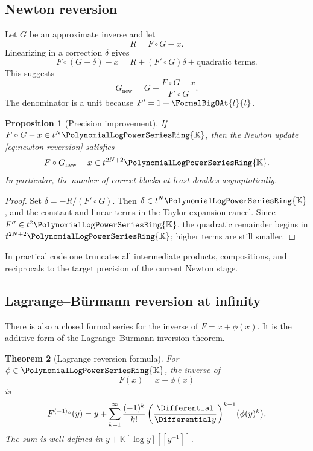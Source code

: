\documentclass[11pt]{article}
\theoremstyle{pltheorem}
\newtheorem{theorem}{Theorem}[section]
\newtheorem{proposition}[theorem]{Proposition}
\newcommand{\K}{\mathbb K}
\newcommand{\PL}{\PolynomialLogPowerSeriesRing{\K}}
\newcommand{\rev}{\langle-1\rangle_{\circ}}
\newcommand{\compose}{\mathbin{\circ}}
\begin{document}
\subsection{Newton reversion}

Let \(G\) be an approximate inverse and let
\begin{equation}\label{eq:reversion-residual}
 R=F\compose G-x.
\end{equation}
Linearizing in a correction \(\delta\) gives
\[
 F\compose(G+\delta)-x
 =R+(F'\compose G)\delta+\text{quadratic terms}.
\]
This suggests
\begin{equation}\label{eq:newton-reversion}
 G_{\mathrm{new}}
 =G-\frac{F\compose G-x}{F'\compose G}.
\end{equation}
The denominator is a unit because \(F'=1+\FormalBigOAt{t}{t}\).

\begin{proposition}[Precision improvement]\label{prop:newton-reversion-precision}
If \(F\compose G-x\in t^N\PL\), then the Newton update
\cref{eq:newton-reversion} satisfies
\begin{equation}\label{eq:newton-reversion-precision}
 F\compose G_{\mathrm{new}}-x\in t^{2N+2}\PL.
\end{equation}
In particular, the number of correct blocks at least doubles asymptotically.
\end{proposition}

\begin{proof}
Set \(\delta=-R/(F'\compose G)\).  Then \(\delta\in t^N\PL\), and the constant and linear terms in the Taylor expansion cancel.  Since \(F''\in t^2\PL\), the quadratic remainder begins in
\(t^{2N+2}\PL\); higher terms are still smaller.
\end{proof}

In practical code one truncates all intermediate products, compositions, and reciprocals to the target precision of the current Newton stage.

\subsection{Lagrange--B\"urmann reversion at infinity}

There is also a closed formal series for the inverse of \(F=x+\phi(x)\).  It is the additive form of the Lagrange--B\"urmann inversion theorem.

\begin{theorem}[Lagrange reversion formula]\label{thm:Lagrange-reversion}
For \(\phi\in\PL\), the inverse of
\begin{equation}\label{eq:F-x-plus-phi}
 F(x)=x+\phi(x)
\end{equation}
is
\begin{equation}\label{eq:Lagrange-reversion}
 F^{\rev}(y)
 =y+\sum_{k=1}^{\infty}\frac{(-1)^k}{k!}
 \left(\frac{\Differential}{\Differential y}\right)^{k-1}\!\bigl(\phi(y)^k\bigr).
\end{equation}
The sum is well defined in \(y+\K[\log y][[y^{-1}]]\).
\end{theorem}
\end{document}
